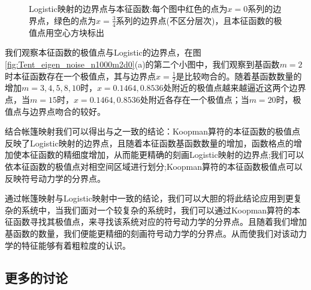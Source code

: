\begin{figure}[!]
    \centering%
      \\
      \\
      \\
      \\
    \caption[Logistic映射的边界点与本征函数]{Logistic映射的边界点与本征函数:每个图中红色的点为$x=0$系列的边界点，绿色的点为$x=\frac{3}{4}$系列的边界点(不区分层次)，且本征函数的极值点用空心方块标出}\label{fig:Logistic_eigen_noise_n1000m2d0}
  \end{figure}

  我们观察本征函数的极值点与Logistic的边界点，在图\ref{fig:Tent_eigen_noise_n1000m2d0}(a)的第二个小图中，我们观察到基函数$m=2$时本征函数存在一个极值点，其与边界点$x=\frac{1}{2}$是比较吻合的。随着基函数数量的增加$m=3,4,5,8,10$时，$x=0.1464,0.8536$处附近的极值点越来越逼近这两个边界点，当$m=15$时，$x=0.1464,0.8536$处附近各存在一个极值点；当$m=20$时，极值点与边界点吻合的较好。

  结合帐篷映射我们可以得出与之一致的结论：Koopman算符的本征函数的极值点反映了Logistic映射的边界点，且随着本征函数基函数数量的增加，函数格点的增加使本征函数的精细度增加，从而能更精确的刻画Logistic映射的边界点;我们可以依本征函数的极值点对相空间区域进行划分;Koopman算符的本征函数极值点可以反映符号动力学的分界点。
  
  通过帐篷映射与Logistic映射中一致的结论，我们可以大胆的将此结论应用到更复杂的系统中，当我们面对一个较复杂的系统时，我们可以通过Koopman算符的本征函数寻找其极值点，来寻找该系统对应的符号动力学的分界点。且随着我们增加基函数的数量，我们便能更精细的刻画符号动力学的分界点。从而使我们对该动力学的特征能够有着粗粒度的认识。

\subsection{更多的讨论}

